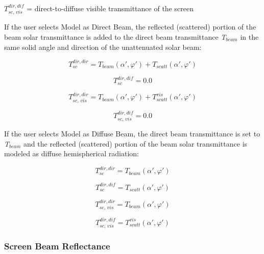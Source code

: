 \(T_{sc,\,vis}^{dir,dif}\) = direct-to-diffuse visible transmittance of the screen

If the user selects Model as Direct Beam, the reflected (scattered) portion of the beam solar transmittance is added to the direct beam transmittance \emph{T\(_{beam}\)} in the same solid angle and direction of the unattenuated solar beam:

\begin{equation}
T_{sc}^{dir,dir} = {T_{beam}}\left( {\alpha ',\varphi '} \right) + {T_{scatt}}\left( {\alpha ',\varphi '} \right)
\end{equation}

\begin{equation}
T_{sc}^{dir,dif} = 0.0
\end{equation}

\begin{equation}
T_{sc,\,vis}^{dir,dir} = {T_{beam}}\left( {\alpha ',\varphi '} \right) + T_{scatt}^{vis}\left( {\alpha ',\varphi '} \right)
\end{equation}

\begin{equation}
T_{sc,\,vis}^{dir,dif} = 0.0
\end{equation}

If the user selects Model as Diffuse Beam, the direct beam transmittance is set to \emph{T\(_{beam}\)} and the reflected (scattered) portion of the beam solar transmittance is modeled as diffuse hemispherical radiation:

\begin{equation}
T_{sc}^{dir,dir} = {T_{beam}}\left( {\alpha ',\varphi '} \right)
\end{equation}

\begin{equation}
T_{sc}^{dir,dif} = {T_{scatt}}\left( {\alpha ',\varphi '} \right)
\end{equation}

\begin{equation}
T_{sc,\,vis}^{dir,dir} = {T_{beam}}\left( {\alpha ',\varphi '} \right)
\end{equation}

\begin{equation}
T_{sc,\,vis}^{dir,dif} = T_{scatt}^{vis}\left( {\alpha ',\varphi '} \right)
\end{equation}

\subsubsection{Screen Beam Reflectance}\label{screen-beam-reflectance}

